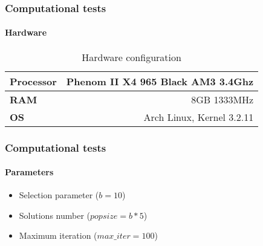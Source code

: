 \begin{frame}
    \frametitle{Computational tests}
    \framesubtitle{Hardware}

    \begin{table}
        \centering
        \begin{tabular}{|l|r|}
            \hline
            \textbf{Processor} & Phenom II X4 965 Black AM3 3.4Ghz\\\hline
            \textbf{RAM} & 8GB 1333MHz\\\hline
            \textbf{OS} & Arch Linux, Kernel 3.2.11 \\\hline
        \end{tabular}
        \label{tab:table1}
        \caption{Hardware configuration}
    \end{table}

\end{frame}

\begin{frame}
    \frametitle{Computational tests}
    \framesubtitle{Parameters}

    \begin{itemize}
        \item Selection parameter ($b = 10$)
        \item Solutions number    ($popsize = b*5$)
        \item Maximum iteration   ($max\_iter = 100$)
    \end{itemize}

\end{frame}

